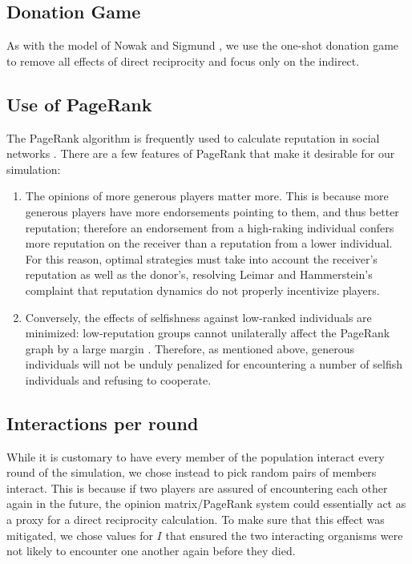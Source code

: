 \documentclass{amsart}
\begin{document}
\subsection{Donation Game}
As with the model of Nowak and Sigmund \cite{nowak_evolution_1998}, we
use the one-shot donation game to remove all effects of direct
reciprocity and focus only on the indirect.

\subsection{Use of PageRank}
\label{sec:whypagerank}

The PageRank algorithm is frequently used to calculate reputation in
social networks \cite{pujol_extracting_2002}. There are a few features
of PageRank that make it desirable for our simulation:
\begin{enumerate}
\item
The opinions of more generous players matter more. This is because
more generous players have more endorsements pointing to them, and
thus better reputation; therefore an endorsement from a high-raking
individual confers more reputation on the receiver than a reputation
from a lower individual. For this reason, optimal strategies must take
into account the receiver's reputation as well as the donor's,
resolving Leimar and Hammerstein's complaint
\cite{leimar_evolution_2001} that reputation dynamics do not properly
incentivize players.
\item
Conversely, the effects of selfishness against low-ranked individuals
are minimized: low-reputation groups cannot unilaterally affect the
PageRank graph by a large margin
\cite{langville_deeper_2004}. Therefore, as mentioned above, generous
individuals will not be unduly penalized for encountering a number of
selfish individuals and refusing to cooperate.
\end{enumerate}

\subsection{Interactions per round}
\label{sec:inter_per_round}

While it is customary to have every member of the population interact
every round of the simulation, we chose instead to pick random pairs
of members interact. This is because if two players are assured of
encountering each other again in the future, the opinion
matrix/PageRank system could essentially act as a proxy for a direct
reciprocity calculation. To make sure that this effect was mitigated,
we chose values for $I$ that ensured the two interacting organisms
were not likely to encounter one another again before they died.
\end{document}
